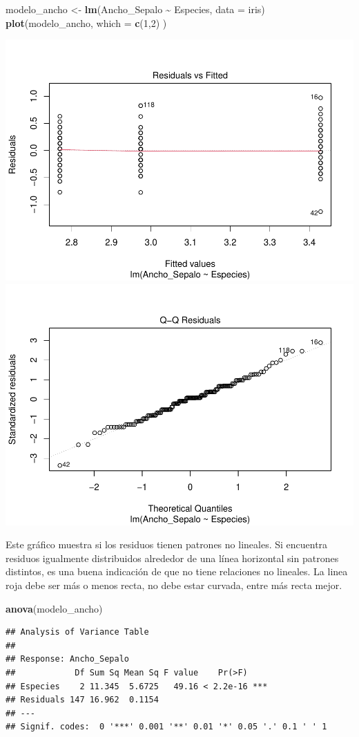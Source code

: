 \documentclass[
]{book}
\newenvironment{Shaded}{\begin{snugshade}}{\end{snugshade}}
\newcommand{\AttributeTok}[1]{\textcolor[rgb]{0.13,0.29,0.53}{#1}}
\newcommand{\DecValTok}[1]{\textcolor[rgb]{0.00,0.00,0.81}{#1}}
\newcommand{\FunctionTok}[1]{\textcolor[rgb]{0.13,0.29,0.53}{\textbf{#1}}}
\newcommand{\NormalTok}[1]{#1}
\newcommand{\OtherTok}[1]{\textcolor[rgb]{0.56,0.35,0.01}{#1}}
\newcommand{\SpecialCharTok}[1]{\textcolor[rgb]{0.81,0.36,0.00}{\textbf{#1}}}
\begin{document}
\begin{Shaded}
\begin{Highlighting}[]
\NormalTok{modelo\_ancho }\OtherTok{\textless{}{-}} \FunctionTok{lm}\NormalTok{(Ancho\_Sepalo }\SpecialCharTok{\textasciitilde{}}\NormalTok{ Especies, }\AttributeTok{data =}\NormalTok{ iris) }
\FunctionTok{plot}\NormalTok{(modelo\_ancho, }\AttributeTok{which =} \FunctionTok{c}\NormalTok{(}\DecValTok{1}\NormalTok{,}\DecValTok{2}\NormalTok{) )}
\end{Highlighting}
\end{Shaded}

\includegraphics[width=0.45\linewidth]{R_Manual_files/figure-latex/unnamed-chunk-255-1}
\includegraphics[width=0.45\linewidth]{R_Manual_files/figure-latex/unnamed-chunk-255-2}

Este gráfico muestra si los residuos tienen patrones no lineales.
Si encuentra residuos igualmente distribuidos alrededor de una línea horizontal sin patrones distintos, es una buena indicación de que no tiene relaciones no lineales.
La linea roja debe ser más o menos recta, no debe estar curvada, entre más recta mejor.

\begin{Shaded}
\begin{Highlighting}[]
\FunctionTok{anova}\NormalTok{(modelo\_ancho)}
\end{Highlighting}
\end{Shaded}

\begin{verbatim}
## Analysis of Variance Table
## 
## Response: Ancho_Sepalo
##            Df Sum Sq Mean Sq F value    Pr(>F)    
## Especies    2 11.345  5.6725   49.16 < 2.2e-16 ***
## Residuals 147 16.962  0.1154                      
## ---
## Signif. codes:  0 '***' 0.001 '**' 0.01 '*' 0.05 '.' 0.1 ' ' 1
\end{verbatim}
\end{document}
